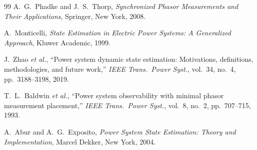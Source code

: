 \documentclass[11pt, a4paper]{article}
\begin{document}
\begin{thebibliography}{99}
A.~G.~Phadke and J.~S.~Thorp,
\emph{Synchronized Phasor Measurements and Their Applications},
Springer, New York, 2008.

A.~Monticelli,
\emph{State Estimation in Electric Power Systems: A Generalized Approach},
Kluwer Academic, 1999.

J.~Zhao \emph{et al.},
``Power system dynamic state estimation: Motivations, definitions, methodologies,
and future work,''
\emph{IEEE Trans.\ Power Syst.}, vol.~34, no.~4, pp.~3188--3198, 2019.

T.~L.~Baldwin \emph{et al.},
``Power system observability with minimal phasor measurement placement,''
\emph{IEEE Trans.\ Power Syst.}, vol.~8, no.~2, pp.~707--715, 1993.

A.~Abur and A.~G.~Exposito,
\emph{Power System State Estimation: Theory and Implementation},
Marcel Dekker, New York, 2004.
\end{thebibliography}
\end{document}

